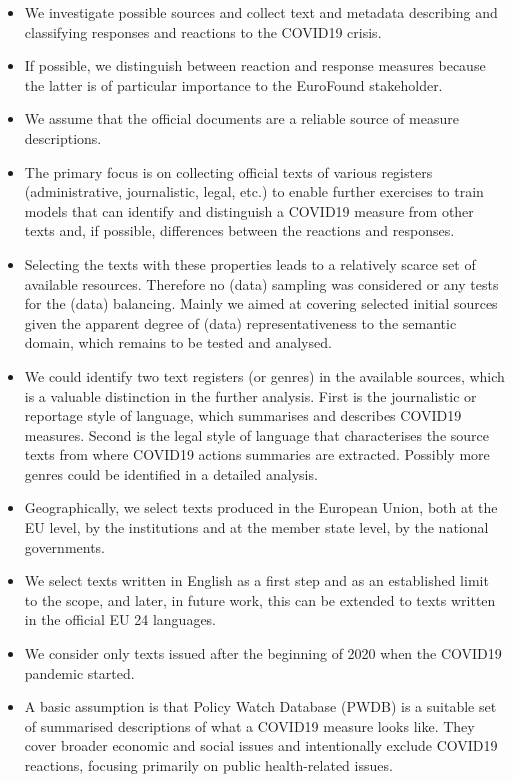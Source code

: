 \begin{itemize}
	\item We investigate possible sources and collect text and metadata describing and classifying responses and reactions to the COVID19 crisis. 
	\item If possible, we distinguish between reaction and response measures because the latter is of particular importance to the EuroFound stakeholder. 
	\item We assume that the official documents are a reliable source of measure descriptions.
	\item The primary focus is on collecting official texts of various registers (administrative, journalistic, legal, etc.) to enable further exercises to train models that can identify and distinguish a COVID19 measure from other texts and, if possible, differences between the reactions and responses.
	\item Selecting the texts with these properties leads to a relatively scarce set of available resources. Therefore no (data) sampling was considered or any tests for the (data) balancing. Mainly we aimed at covering selected initial sources given the apparent degree of (data) representativeness to the semantic domain, which remains to be tested and analysed.
	\item We could identify two text registers (or genres) in the available sources, which is a valuable distinction in the further analysis. First is the journalistic or reportage style of language, which summarises and describes COVID19 measures. Second is the legal style of language that characterises the source texts from where COVID19 actions summaries are extracted. Possibly more genres could be identified in a detailed analysis. 
	\item Geographically, we select texts produced in the European Union, both at the EU level, by the institutions and at the member state level, by the national governments. 
	\item We select texts written in English as a first step and as an established limit to the scope, and later, in future work, this can be extended to texts written in the official EU 24 languages.
	\item We consider only texts issued after the beginning of 2020 when the COVID19 pandemic started.

	\item A basic assumption is that Policy Watch Database (PWDB) is a suitable set of summarised descriptions of what a COVID19 measure looks like. They cover broader economic and social issues and intentionally exclude COVID19 reactions, focusing primarily on public health-related issues.
\end{itemize}

